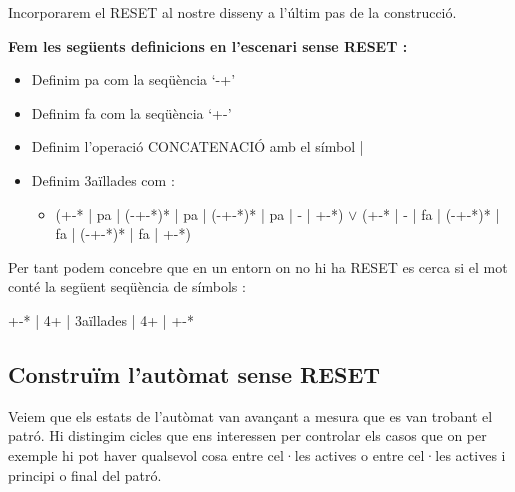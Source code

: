 \documentclass[12pt,a4paper]{report}
\begin{document}
Incorporarem el RESET al nostre disseny a l’últim pas de la construcció.

\textbf{Fem les següents definicions en l’escenari sense RESET :}

\begin{itemize}
\item Definim pa com la seqüència ‘-+’
\item Definim fa com la seqüència ‘+-’
\item Definim l’operació CONCATENACIÓ amb el símbol |
\item Definim 3aïllades com :
\begin{itemize}
\item ({+-}* | pa | (-{+-}*)* | pa | (-{+-}*)* | pa | - | {+-}*) $\vee$ ({+-}* | - | fa | (-{+-}*)* | fa | (-{+-}*)* | fa | {+-}*)
\end{itemize}
\end{itemize}

Per tant podem concebre que en un entorn on no hi ha RESET es cerca si el mot conté la següent seqüència de símbols :

\begin{center}
{+-}* | 4+ | 3aïllades | 4+ | {+-}*
\end{center}

\subsection{Construïm l’autòmat sense RESET}

Veiem que els estats de l'autòmat van avançant a mesura que es van trobant el patró. Hi distingim cicles que ens interessen per controlar els casos que on per exemple hi pot haver qualsevol cosa entre cel·les actives o entre cel·les actives i principi o final del patró.
\end{document}
